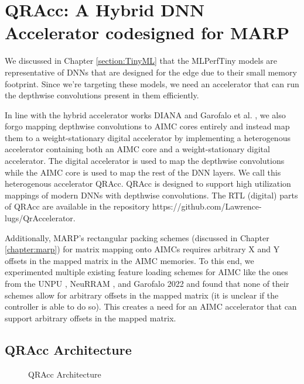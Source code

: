 \chapter{QRAcc: A Hybrid DNN Accelerator codesigned for MARP}

\label{chap:qracc}

We discussed in Chapter \ref{section:TinyML} that the MLPerfTiny models are representative of DNNs that are designed for the edge due to their small memory footprint. Since we're targeting these models, we need an accelerator that can run the depthwise convolutions present in them efficiently.

In line with the hybrid accelerator works DIANA \cite{houshmand2022diana} and Garofalo et al. \cite{garofalo2022heterogeneous}, we also forgo mapping depthwise convolutions to AIMC cores entirely and instead map them to a weight-stationary digital accelerator by implementing a heterogenous accelerator containing both an AIMC core and a weight-stationary digital accelerator. The digital accelerator is used to map the depthwise convolutions while the AIMC core is used to map the rest of the DNN layers. We call this heterogenous accelerator QRAcc. QRAcc is designed to support high utilization mappings of modern DNNs with depthwise convolutions. The RTL (digital) parts of QRAcc are available in the repository https://github.com/Lawrence-lugs/QrAccelerator.

Additionally, MARP's rectangular packing schemes (discussed in Chapter \ref{chapter:marp}) for matrix mapping onto AIMCs requires arbitrary X and Y offsets in the mapped matrix in the AIMC memories. To this end, we experimented multiple existing feature loading schemes for AIMC like the ones from the UNPU \cite{lee2018unpu}, NeuRRAM \cite{wanneurram}, and Garofalo 2022 \cite{garofalo2022heterogeneous} and found that none of their schemes allow for arbitrary offsets in the mapped matrix (it is unclear if the controller is able to do so). This creates a need for an AIMC accelerator that can support arbitrary offsets in the mapped matrix.

\section{QRAcc Architecture}

\begin{figure}[h]
    \centering
    
    \caption{QRAcc Architecture}
    \label{fig:qracc_architecture}
\end{figure}


